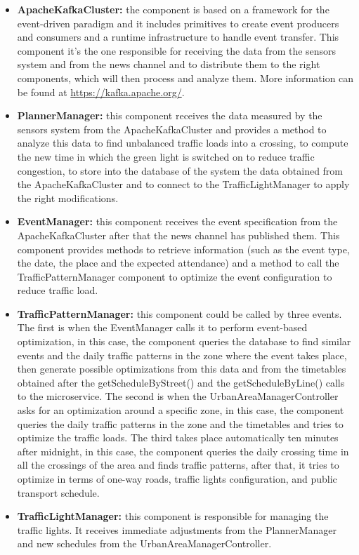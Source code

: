 \documentclass[12pt, a4paper, twoside, openright]{report}
\begin{document}
\begin{itemize}
\item
  \textbf{ApacheKafkaCluster:} the component is based on a framework for
  the event-driven paradigm and it includes primitives to create event
  producers and consumers and a runtime infrastructure to handle event
  transfer. This component it's the one responsible for receiving the data
  from the sensors system and from the news channel and to distribute
  them to the right components, which will then process and analyze them.
  More information can be found at \url{https://kafka.apache.org/}.
\item
  \textbf{PlannerManager:} this component receives the data
  measured by the sensors system from the ApacheKafkaCluster and
  provides a method to analyze this data to find unbalanced traffic loads
  into a crossing, to compute the new time in which the green light is
  switched on to reduce traffic congestion, to store into the database
  of the system the data obtained from the ApacheKafkaCluster and to
  connect to the TrafficLightManager to apply the right
  modifications.
\item
  \textbf{EventManager:} this component receives the event specification
  from the ApacheKafkaCluster after that the news channel has published
  them. This component provides methods to retrieve information (such
  as the event type, the date, the place and the expected attendance)
  and a method to call the TrafficPatternManager component to optimize
  the event configuration to reduce traffic load.
\item
  \textbf{TrafficPatternManager:} this component could be called by
  three events. The first is when the EventManager calls it to perform
  event-based optimization, in this case, the component queries the
  database to find similar events and the daily traffic patterns in the
  zone where the event takes place, then generate possible optimizations
  from this data and from the timetables obtained after the
  getScheduleByStreet() and the getScheduleByLine() calls to the
  microservice. The second is when the UrbanAreaManagerController asks
  for an optimization around a specific zone, in this case, the component
  queries the daily traffic patterns in the zone and the timetables and
  tries to optimize the traffic loads. The third takes place
  automatically ten minutes after midnight, in this case, the
  component queries the daily crossing time in all the crossings of the
  area and finds traffic patterns, after that, it tries to optimize in
  terms of one-way roads, traffic lights configuration, and public
  transport schedule.
\item 
  \textbf{TrafficLightManager:} this component is responsible for
  managing the traffic lights. It receives immediate adjustments from the
  PlannerManager and new schedules from the UrbanAreaManagerController.
\end{itemize}
\end{document}
